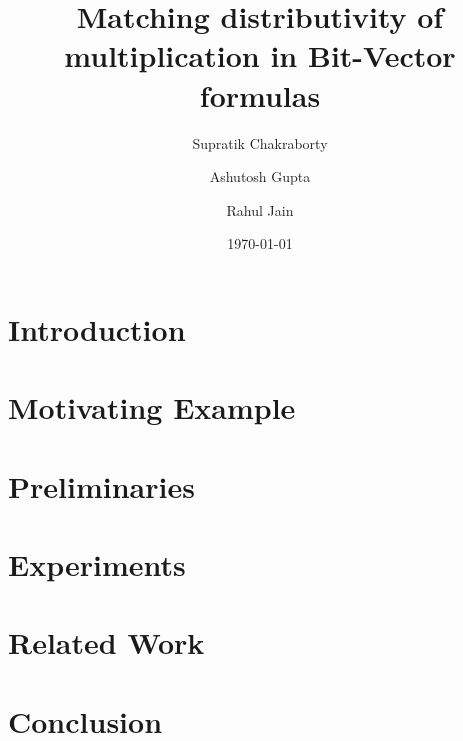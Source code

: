 \documentclass{llncs}
\begin{document}
\title{Matching distributivity of multiplication in Bit-Vector formulas}

\author{Supratik Chakraborty \and Ashutosh Gupta \and Rahul Jain}


\date{\today}

\maketitle
\begin{abstract}

\end{abstract}

\section{Introduction}
\label{sec:intro}


\section{Motivating Example}
\label{sec:motivating}


\section{Preliminaries}
\label{sec:prelim}


% 

\section{Experiments}
\label{sec:experiments}


\section{Related Work}
\label{sec:related}

\section{Conclusion}
\label{sec:conclusion}




\end{document}
